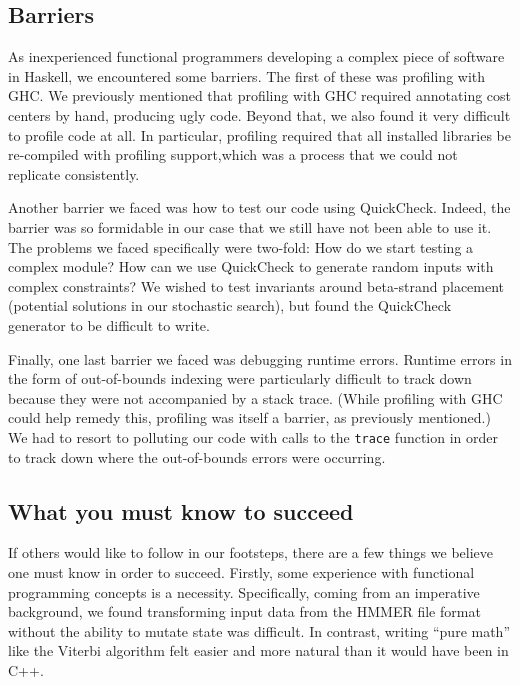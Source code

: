 \documentclass[preprint,nonatbib,blockstyle,nocopyrightspace,times]{sigplanconf}
\begin{document}
\subsection{Barriers}

As inexperienced functional programmers developing a complex piece of
software in Haskell, we encountered some barriers.
The first of these was profiling with GHC.
We previously mentioned that profiling with GHC required annotating
cost centers by hand, producing ugly code.
Beyond that, we also found it very difficult to profile code at all.
In particular, profiling required that all installed libraries be re-compiled
with profiling support,which was a process that we could not replicate
consistently.

Another barrier we faced was how to test our code using QuickCheck.
Indeed, the barrier was so formidable in our case that we still have not been 
able to use it.
The problems we faced specifically were two-fold: How do we start testing
a complex module? How can we use QuickCheck to generate random inputs with 
complex constraints? 
We wished to test invariants around beta-strand placement 
(potential solutions in our stochastic search), but found the QuickCheck generator
to be difficult to write.

Finally, one last barrier we faced was debugging runtime errors.
Runtime errors in the form of out-of-bounds indexing were particularly 
difficult to track down because they were not accompanied by a stack trace.
(While profiling with GHC could help remedy this, profiling was itself a 
barrier, as previously mentioned.)
We had to resort to polluting our code with calls to the \texttt{trace} function 
in order to track down where the out-of-bounds errors were occurring.


\subsection{What you must know to succeed}
If others would like to follow in our footsteps, there are a few
things we believe one must know in order to succeed.
Firstly, some experience with functional programming concepts is a necessity. 
Specifically, coming from an imperative background, we found transforming input data 
from the HMMER file format without the ability to mutate state was difficult.
In contrast, writing ``pure math'' like the Viterbi algorithm felt easier
and more natural than it would have been in C++.
\end{document}
